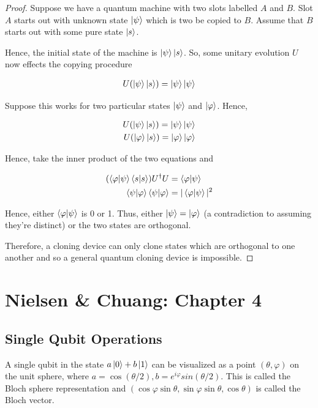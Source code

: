 \documentclass[11pt]{article}
\newcommand\0{\mathbf{0}}
\newcommand\<{\langle}
\renewcommand\>{\rangle}
\renewcommand\phi{\varphi}
\begin{document}
\begin{proof}
Suppose we have a quantum machine with two slots labelled $A$ and $B$. Slot $A$ starts out with unknown state $\ket{\psi}$ which is two be copied to $B$. Assume that $B$ starts out with some pure state $\ket{s}$.

Hence, the initial state of the machine is $\ket{\psi}\ket{s}$. So, some unitary evolution $U$ now effects the copying procedure

\begin{align*}
	U(\ket{\psi}\ket{s}) = \ket{\psi}\ket{\psi}
\end{align*}
	
	Suppose this works for two particular states $\ket{\psi}$ and $\ket{\phi}$. Hence,
	
	\begin{align*}
		U(\ket{\psi}\ket{s}) = \ket{\psi}\ket{\psi} \\
		U(\ket{\phi}\ket{s}) = \ket{\phi}\ket{\phi}
	\end{align*}
	
	Hence, take the inner product of the two equations and 
	
	\begin{align*}
		(\bra{\phi}\ket{\psi}\bra{s}\ket{s})U^\dag U &= \bra{\phi}\ket{\psi} \\
		\bra{\psi}\ket{\phi}\bra{\psi}\ket{\phi} &= |\bra{\phi}\ket{\psi}|^2
	\end{align*}
	
	Hence, either $\bra{\phi}\ket{\psi}$ is 0 or 1. Thus, either $\ket{\psi} = \ket{\phi}$ (a contradiction to assuming they're distinct) or the two states are orthogonal.
	
	Therefore, a cloning device can only clone states which are orthogonal to one another and so a general quantum cloning device is impossible.  
\end{proof}

\section{Nielsen \& Chuang: Chapter 4}

\subsection{Single Qubit Operations}

A single qubit in the state $a \ket{0} + b \ket{1}$ can be visualized as a point $(\theta, \phi)$ on the unit sphere, where $a = \cos(\theta / 2), b = e^{i\phi}sin(\theta / 2)$. This is called the Bloch sphere representation and $(\cos \phi \sin \theta , \sin \phi \sin \theta, \cos \theta)$ is called the Bloch vector. 
\end{document}
